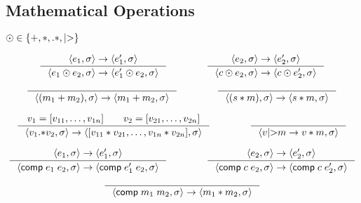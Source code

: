 \documentclass{article}
\begin{document}
\subsection{Mathematical Operations}

$\odot\in\{+,*,\mathsf{.*},\textnormal{|>}\}$

\[
\inference[]{\env{e_1}->\env{e_1'}}{\env{e_1\odot e_2}->\env{e_1'\odot e_2}}
\qquad\qquad
\inference[]{\env{e_2}->\env{e_2'}}{\env{c\odot e_2}->\env{c\odot e_2'}}
\]

\[
\inference[]{}{\env{(m_1+m_2)}->\env{m_1+m_2}}
\qquad\qquad
\inference[]{}{\env{(s*m)}->\env{s*m}}
\]

\[
\inference[]{v_1=[v_{11},\dots,v_{1n}]\qquad v_2=[v_{21},\dots,v_{2n}]}
{\env{v_1\mathsf{.*}v_2}->\env{[v_{11}*v_{21},\dots,v_{1n}*v_{2n}]}}
\qquad\qquad
\inference[]{}
{\env{v\textnormal{|>}m->v*m}}
\]

\[
\inference[]{\env{e_1}->\env{e_1'}}{\env{\mathsf{comp}\;e_1\;e_2}->\env{\mathsf{comp}\;e_1'\;e_2}}
\qquad\qquad
\inference[]{\env{e_2}->\env{e_2'}}{\env{\mathsf{comp}\;c\;e_2}->\env{\mathsf{comp}\;c\;e_2'}}
\]

\[
\inference[]{}{\env{\mathsf{comp}\;m_1\;m_2}->\env{m_1*m_2}}
\]
\end{document}
